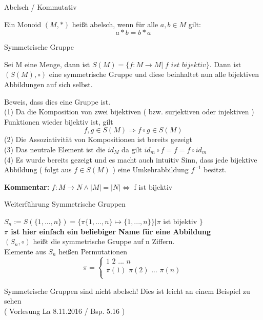 \documentclass[headsepline,12pt,a4paper]{scrartcl}
\begin{document}
\begin{center}
\item[Abelsch / Kommutativ]
\end{center}
\item Ein Monoid $(M, *)$ heißt abelsch, wenn für alle $ a,b \in M $ gilt: $$ a * b = b * a $$
\begin{center}

\item[Symmetrische Gruppe]
\end{center}
\item Sei M eine Menge, dann ist $ S(M) = \{ f: M \rightarrow M | \; \textit{f ist bijektiv} \} $. Dann ist $(S(M), \circ )$ eine symmetrische Gruppe und diese beinhaltet nun alle bijektiven Abbildungen auf sich selbst.
\item Beweis, dass dies eine Gruppe ist. \\
(1) Da die Komposition von zwei bijektiven ( bzw. surjektiven oder injektiven ) Funktionen wieder bijektiv ist, gilt \\
$$ f,g \in S(M) \Rightarrow f \circ g \in S(M) $$
(2) Die Assoziativität von Kompositionen ist bereits gezeigt \\
(3) Das neutrale Element ist die $ id_M $ da gilt $ id_m \circ f = f = f \circ id_m $ \\
(4) Es wurde bereits gezeigt und es macht auch intuitiv Sinn, dass jede bijektive Abbildung ( folgt aus $f\in S(M)$ ) eine Umkehrabbildung $ f^{-1}$ besitzt. \\
\item \textbf{Kommentar:} $ f: M \rightarrow N  \wedge |M|=|N| \Leftrightarrow $ f ist bijektiv
 
\begin{center}
\item[Weiterführung Symmetrische Gruppen]
\end{center}
\item $S_n:= S(\{1,...,n\})= \{\pi \{1,...,n\} \mapsto \{1,...,n\} \} | \pi $  ist bijektiv $ \} $ \\
\textbf{$\pi$ ist hier einfach ein beliebiger Name für eine Abbildung }\\
$(S_n, \circ ) $ heißt die symmetrische Gruppe auf n Ziffern. \\
Elemente aus $S_n$ heißen Permutationen
$$ \pi = \begin{cases} 
1 \, \, 2 \, \, ... \, \, n  \\
\pi (1) \, \, \pi (2) \, \, ... \, \, \pi (n)  \\
\end{cases} $$
\item Symmetrische Gruppen sind nicht abelsch! Dies ist leicht an einem Beispiel zu sehen \\
( Vorlesung La 8.11.2016 / Bsp. 5.16 )
\end{document}
